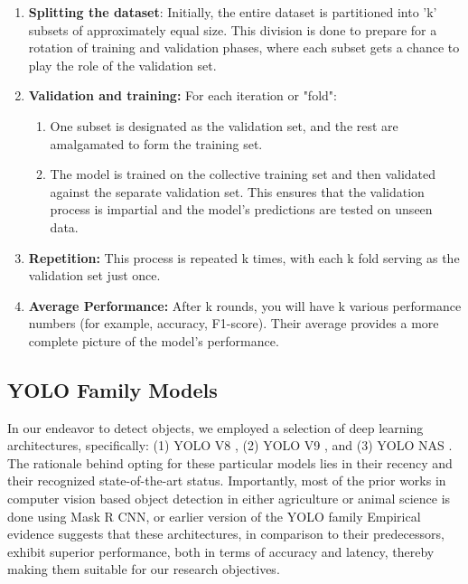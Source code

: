 \begin{enumerate}
    \item \textbf{Splitting the dataset}: Initially, the entire dataset is partitioned into 'k' subsets of approximately equal size. This division is done to prepare for a rotation of training and validation phases, where each subset gets a chance to play the role of the validation set.
    \item \textbf{Validation and training:} For each iteration or "fold":

    \begin{enumerate}
        \item One subset is designated as the validation set, and the rest are amalgamated to form the training set.
        \item The model is trained on the collective training set and then validated against the separate validation set. This ensures that the validation process is impartial and the model's predictions are tested on unseen data.
    \end{enumerate}

    \item \textbf{Repetition:} This process is repeated k times, with each k fold serving as the validation set just once.

    \item  \textbf{Average Performance:} After k rounds, you will have k various performance numbers (for example, accuracy, F1-score). Their average provides a more complete picture of the model's performance.
\end{enumerate}



\subsection{YOLO Family Models}

In our endeavor to detect objects, we employed a selection of deep learning architectures, specifically: (1) YOLO V8 \cite{ultralyticsYOLOv8}, (2) YOLO V9 \cite{wang2024yolov9}, and (3) YOLO NAS \cite{ultralyticsYOLONASNeural}. The rationale behind opting for these particular models lies in their recency and their recognized state-of-the-art status. Importantly, most of the prior works in computer vision based object detection in either agriculture or animal science is done using Mask R CNN, or earlier version of the YOLO family Empirical evidence suggests that these architectures, in comparison to their predecessors, exhibit superior performance, both in terms of accuracy and latency, thereby making them suitable for our research objectives.

